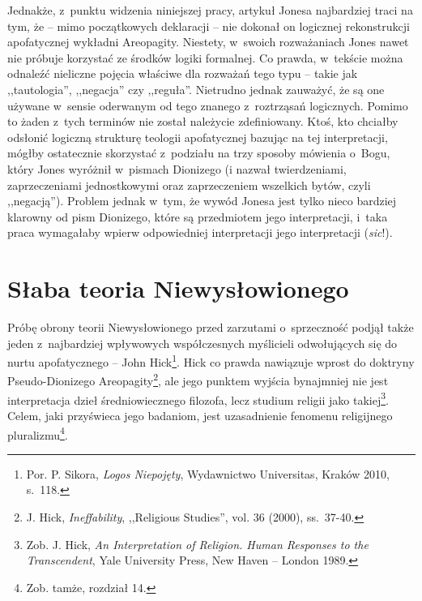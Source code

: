 Jednakże, z~punktu widzenia niniejszej pracy, artykuł Jonesa najbardziej traci na tym, że -- mimo początkowych deklaracji -- nie dokonał on logicznej rekonstrukcji apofatycznej wykładni Areopagity. Niestety, w~swoich rozważaniach Jones nawet nie próbuje korzystać ze środków logiki formalnej. Co prawda, w~tekście można odnaleźć nieliczne pojęcia właściwe dla rozważań tego typu -- takie jak ,,tautologia'', ,,negacja'' czy ,,reguła''. Nietrudno jednak zauważyć, że są one używane w~sensie
oderwanym
od tego znanego z~roztrząsań logicznych. Pomimo to żaden z~tych terminów nie został należycie zdefiniowany. Ktoś, kto chciałby odsłonić logiczną strukturę teologii apofatycznej bazując na tej interpretacji, mógłby ostatecznie skorzystać z~podziału na trzy sposoby mówienia o~Bogu, który Jones wyróżnił w~pismach Dionizego (i nazwał twierdzeniami, zaprzeczeniami jednostkowymi oraz zaprzeczeniem wszelkich bytów, czyli ,,negacją''). Problem jednak w~tym, że wywód Jonesa jest tylko nieco bardziej klarowny od pism Dionizego, które są przedmiotem jego interpretacji, i~taka praca wymagałaby wpierw odpowiedniej interpretacji jego interpretacji (\textit{sic}!).


\chapter{Słaba teoria Niewysłowionego}\label{sil-slabatn}

Próbę obrony teorii Niewysłowionego przed zarzutami o~sprzeczność podjął także jeden z~najbardziej wpływowych współczesnych myślicieli odwołujących się do nurtu apofatycznego -- John Hick\footnote{Por. P. Sikora, \textit{Logos Niepojęty}, Wydawnictwo Universitas, Kraków 2010, s.~118.}. Hick co prawda nawiązuje wprost do doktryny Pseudo-Dionizego Areopagity\footnote{J. Hick, \textit{Ineffability}, ,,Religious Studies'', vol. 36 (2000), ss.~37-40.}, ale jego punktem wyjścia bynajmniej nie jest interpretacja dzieł średniowiecznego filozofa, lecz studium religii jako takiej\footnote{Zob. J. Hick, \textit{An Interpretation of Religion. Human Responses to the Transcendent}, Yale University Press, New Haven -- London 1989.}. Celem, jaki przyświeca jego badaniom, jest uzasadnienie fenomenu religijnego pluralizmu\footnote{Zob. tamże, rozdział 14.}.

